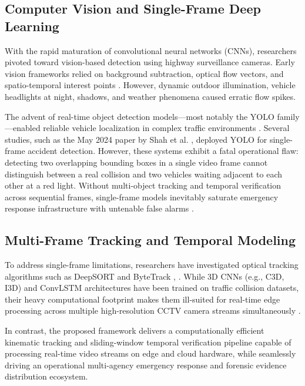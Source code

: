 \documentclass[conference]{IEEEtran}
\begin{document}
\subsection{Computer Vision and Single-Frame Deep Learning}
With the rapid maturation of convolutional neural networks (CNNs), researchers pivoted toward vision-based detection using highway surveillance cameras. Early vision frameworks relied on background subtraction, optical flow vectors, and spatio-temporal interest points \cite{veeraraghavan2007deterministic}. However, dynamic outdoor illumination, vehicle headlights at night, shadows, and weather phenomena caused erratic flow spikes.

The advent of real-time object detection models---most notably the YOLO family---enabled reliable vehicle localization in complex traffic environments \cite{redmon2016you}. Several studies, such as the May 2024 paper by Shah et al. \cite{shah2024accisense}, deployed YOLO for single-frame accident detection. However, these systems exhibit a fatal operational flaw: detecting two overlapping bounding boxes in a single video frame cannot distinguish between a real collision and two vehicles waiting adjacent to each other at a red light. Without multi-object tracking and temporal verification across sequential frames, single-frame models inevitably saturate emergency response infrastructure with untenable false alarms \cite{paul2022limitations}.

\subsection{Multi-Frame Tracking and Temporal Modeling}
To address single-frame limitations, researchers have investigated optical tracking algorithms such as DeepSORT and ByteTrack \cite{wojke2017simple}, \cite{zhang2022bytetrack}. While 3D CNNs (e.g., C3D, I3D) and ConvLSTM architectures have been trained on traffic collision datasets, their heavy computational footprint makes them ill-suited for real-time edge processing across multiple high-resolution CCTV camera streams simultaneously \cite{tran2015learning}. 

In contrast, the proposed framework delivers a computationally efficient kinematic tracking and sliding-window temporal verification pipeline capable of processing real-time video streams on edge and cloud hardware, while seamlessly driving an operational multi-agency emergency response and forensic evidence distribution ecosystem.
\end{document}

